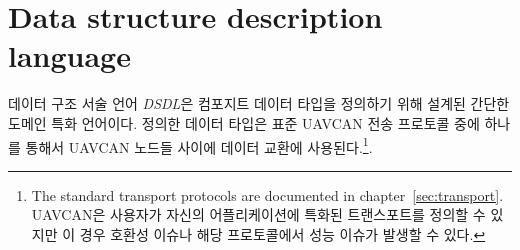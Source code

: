 \chapter{Data structure description language}\label{sec:dsdl}

데이터 구조 서술 언어 \emph{DSDL}은 컴포지트 데이터 타입을 정의하기 위해 설계된 간단한 도메인 특화 언어이다.
정의한 데이터 타입은 표준 UAVCAN 전송 프로토콜 중에 하나를 통해서 UAVCAN 노드들 사이에 데이터 교환에 사용된다.\footnote{The standard transport protocols are documented in chapter~\ref{sec:transport}.
UAVCAN은 사용자가 자신의 어플리케이션에 특화된 트랜스포트를 정의할 수 있지만 이 경우 호환성 이슈나 해당 프로토콜에서 성능 이슈가 발생할 수 있다.}.










